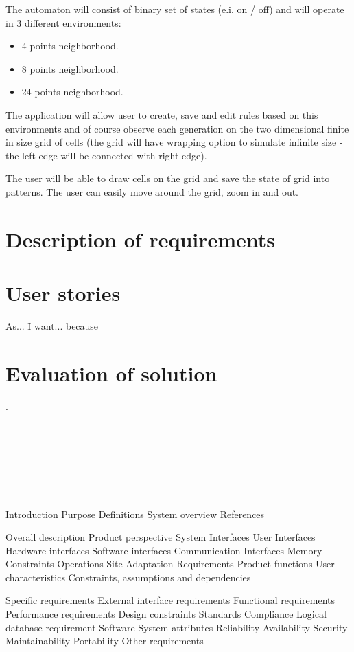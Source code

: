 \documentclass{article}
\begin{document}
\hspace{15pt} The automaton will consist
of binary set of states (e.i. on / off) and will operate in 3 different environments:
\begin{itemize}
	\item 4 points neighborhood.
	\item 8 points neighborhood.
	\item 24 points neighborhood.
\end{itemize}
\par The application will allow user to create, save and edit rules based on this environments and of course observe each generation on the two dimensional finite in size grid of cells
(the grid will have wrapping option to simulate infinite size - the left edge will be connected with right edge).
\par The user will be able to draw cells on the grid and save the state of grid into patterns.
The user can easily move around the grid, zoom in and out.



\section{Description of requirements}



\section{User stories}
As... I want... because

\section{Evaluation of solution}


.
\\\\\\\\\\\\\\\\Introduction
	Purpose
	Definitions
	System overview
	References
	
Overall description
	Product perspective
		System Interfaces
		User Interfaces
		Hardware interfaces
		Software interfaces
		Communication Interfaces
		Memory Constraints
		Operations
		Site Adaptation Requirements
	Product functions
	User characteristics
	Constraints, assumptions and dependencies
	
Specific requirements
	External interface requirements
	Functional requirements
	Performance requirements
	Design constraints
		Standards Compliance
	Logical database requirement
	Software System attributes
		Reliability
		Availability
		Security
		Maintainability
		Portability
	Other requirements
\end{document}
